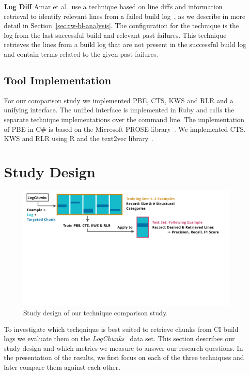 \noindent
\textbf{Log Diff}
Amar et al.\ use a technique based on line diffs and information retrieval to identify relevant lines from a failed build log~\cite{amar2019mining}, as we describe in more detail in Section~\ref{sec:rw-bl-analysis}.
The configuration for the technique is the log from the last successful build and relevant past failures.
This technique retrieves the lines from a build log that are not present in the successful build log and contain terms related to the given past failures.

\subsection{Tool Implementation}
For our comparison study we implemented PBE, CTS, KWS and RLR and a unifying interface.
The unified interface is implemented in Ruby and calls the separate technique implementations over the command line.
The implementation of PBE in C\# is based on the Microsoft PROSE library~\cite{prose2019webpage}.
We implemented CTS, KWS and RLR using R and the text2vec library~\cite{text2vec2019webpage}.


\section{Study Design}
\label{sec:study}

\begin{figure}[tb]
	\centering
	\includegraphics[width=\textwidth, trim={0.4cm 8.4cm 1.2cm 0.3cm}, clip]{img/study.pdf}
	\caption{Study design of our technique comparison study.}
	\label{fig:study}
\end{figure}

To investigate which techqnique is best suited to retrieve chunks from CI build
logs we evaluate them on the \emph{LogChunks}~\cite{brandt2020logchunks} data set.
This section describes our study design and which metrics we measure to answer our research questions.
In the presentation of the results, we first focus on each of the three techniques and later compare them against each other.

